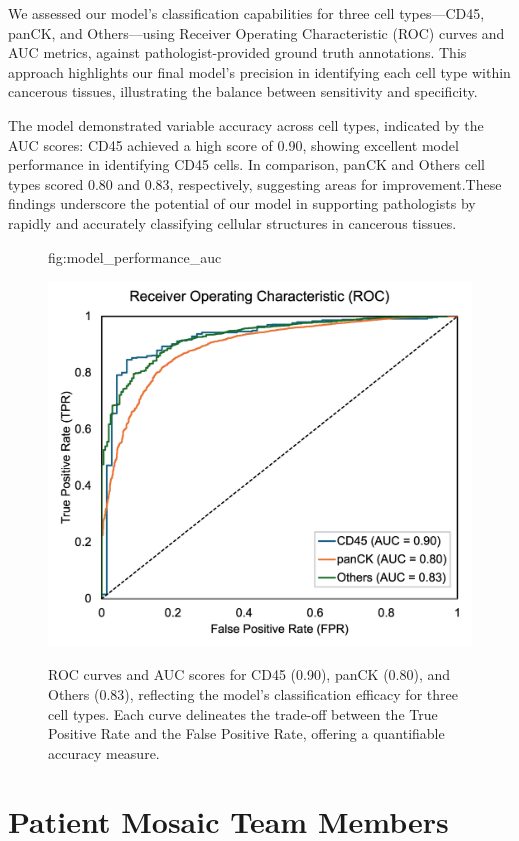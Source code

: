 \documentclass{midl} %
\begin{document}
We assessed our model's classification capabilities for three cell types—CD45, panCK, and Others—using Receiver Operating Characteristic (ROC) curves and AUC metrics, against pathologist-provided ground truth annotations. This approach highlights our final model's precision in identifying each cell type within cancerous tissues, illustrating the balance between sensitivity and specificity.

The model demonstrated variable accuracy across cell types, indicated by the AUC scores: CD45 achieved a high score of 0.90, showing excellent model performance in identifying CD45 cells. In comparison, panCK and Others cell types scored 0.80 and 0.83, respectively, suggesting areas for improvement.These findings underscore the potential of our model in supporting pathologists by rapidly and accurately classifying cellular structures in cancerous tissues.

\begin{figure}[htbp]
\floatconts
  {fig:model_performance_auc}
  {\caption{ROC curves and AUC scores for CD45 (0.90), panCK (0.80), and Others (0.83), reflecting the model's classification efficacy for three cell types. Each curve delineates the trade-off between the True Positive Rate and the False Positive Rate, offering a quantifiable accuracy measure.}}
  {\includegraphics[width=1\linewidth]{images/5.png}}
\end{figure}




\section{Patient Mosaic Team Members}
\label{sec:appendix_team_members}
\end{document}
